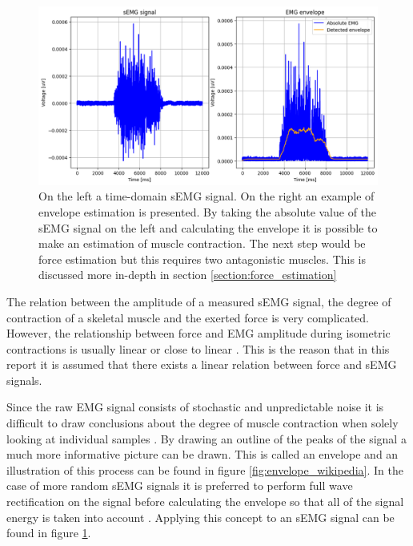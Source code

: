 \begin{figure}[h!t]
	\begin{center}
		\includegraphics[width=1.0\columnwidth]{images/amplitude_force_estimation_example.png}
	\end{center}
	\caption{On the left a time-domain sEMG signal. On the right an example of envelope estimation is presented. By taking the absolute value of the sEMG signal on the left and calculating the envelope it is possible to make an estimation of muscle contraction. The next step would be force estimation but this requires two antagonistic muscles. This is discussed more in-depth in section \ref{section:force_estimation}}
	\label{fig:amplitude_estimation_example}
\end{figure}

The relation between the amplitude of a measured sEMG signal, the degree of contraction of a skeletal muscle and the exerted force is very complicated. However, the relationship between force and EMG amplitude during isometric contractions is usually linear or close to linear  \cite{interpreting_muscle_function_from_emg} \cite{adaptive_filter_dry_electrode}. This is the reason that in this report it is assumed that there exists a linear relation between force and sEMG signals.

Since the raw EMG signal consists of stochastic and unpredictable noise it is difficult to draw conclusions about the degree of muscle contraction when solely looking at individual samples \cite{semg_signals_analysis_and_applications}. By drawing an outline of the peaks of the signal a much more informative picture can be drawn. This is called an envelope and an illustration of this process can be found in figure \ref{fig:envelope_wikipedia}. In the case of more random sEMG signals it is preferred to perform full wave rectification on the signal before calculating the envelope so that all of the signal energy is taken into account \cite{semg_signals_analysis_and_applications}. Applying this concept to an sEMG signal can be found in figure \ref{fig:amplitude_estimation_example}.

